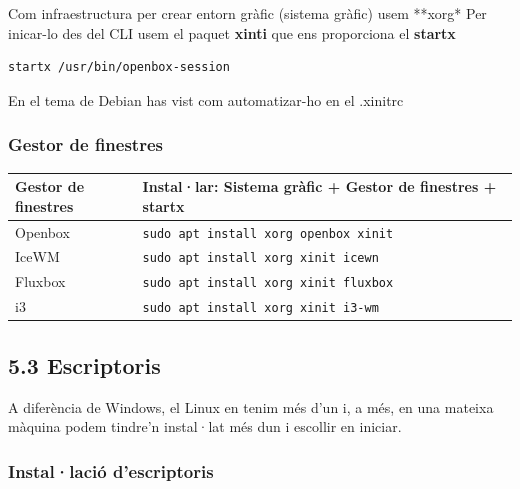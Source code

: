 \documentclass[
  catalan,
  a4paper,
]{article}
\begin{document}
Com infraestructura per crear entorn gràfic (sistema gràfic) usem
**xorg* Per inicar-lo des del CLI usem el paquet \textbf{xinti} que ens
proporciona el \textbf{startx}

\begin{verbatim}
startx /usr/bin/openbox-session
\end{verbatim}

En el tema de Debian has vist com automatizar-ho en el .xinitrc

\subsubsection{Gestor de finestres}\label{gestor-de-finestres}

\begin{longtable}[]{@{}
  >{\raggedright\arraybackslash}p{}
  >{\raggedright\arraybackslash}p{}@{}}
\toprule\noalign{}
\begin{minipage}[b]{\linewidth}\raggedright
\textbf{Gestor de finestres}
\end{minipage} & \begin{minipage}[b]{\linewidth}\raggedright
Instal·lar: Sistema gràfic + Gestor de finestres + startx
\end{minipage} \\
\midrule\noalign{}
\endhead
\bottomrule\noalign{}
\endlastfoot
Openbox & \texttt{sudo\ apt\ install\ xorg\ openbox\ xinit} \\
IceWM & \texttt{sudo\ apt\ install\ xorg\ xinit\ icewn} \\
Fluxbox & \texttt{sudo\ apt\ install\ xorg\ xinit\ fluxbox} \\
i3 & \texttt{sudo\ apt\ install\ xorg\ xinit\ i3-wm} \\
\end{longtable}

\subsection{5.3 Escriptoris}\label{escriptoris}

A diferència de Windows, el Linux en tenim més d'un i, a més, en una
mateixa màquina podem tindre'n instal·lat més dun i escollir en iniciar.

\subsubsection{Instal·lació
d'escriptoris}\label{installaciuxf3-descriptoris}
\end{document}

